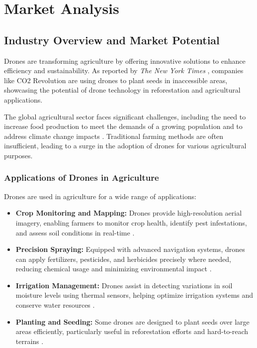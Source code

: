 \chapter{Market Analysis}

\section{Industry Overview and Market Potential}

Drones are transforming agriculture by offering innovative solutions to enhance efficiency and sustainability. As reported by \textit{The New York Times} \cite{chaundler2021}, companies like CO2 Revolution are using drones to plant seeds in inaccessible areas, showcasing the potential of drone technology in reforestation and agricultural applications.

The global agricultural sector faces significant challenges, including the need to increase food production to meet the demands of a growing population and to address climate change impacts \citep{nazarov2023}. Traditional farming methods are often insufficient, leading to a surge in the adoption of drones for various agricultural purposes.

\subsection{Applications of Drones in Agriculture}

Drones are used in agriculture for a wide range of applications:

\begin{itemize} 
	\item \textbf{Crop Monitoring and Mapping:} Drones provide high-resolution aerial imagery, enabling farmers to monitor crop health, identify pest infestations, and assess soil conditions in real-time \citep{nazarov2023, alliedmarketresearch2021}. 
	\item \textbf{Precision Spraying:} Equipped with advanced navigation systems, drones can apply fertilizers, pesticides, and herbicides precisely where needed, reducing chemical usage and minimizing environmental impact \citep{guardianagriculture, plantdiseasedetection2023}. 
	\item \textbf{Irrigation Management:} Drones assist in detecting variations in soil moisture levels using thermal sensors, helping optimize irrigation systems and conserve water resources \citep{nazarov2023}. 
	\item \textbf{Planting and Seeding:} Some drones are designed to plant seeds over large areas efficiently, particularly useful in reforestation efforts and hard-to-reach terrains \citep{chaundler2021}. 
\end{itemize}

